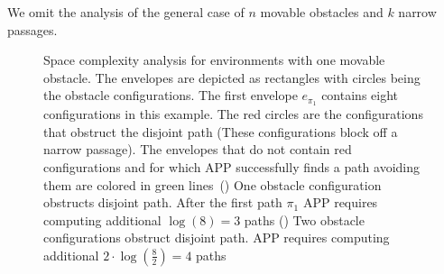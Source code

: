 \documentclass[a4paper]{report}
\begin{document}
We omit the analysis of the general case of $n$ movable obstacles and $k$ narrow passages.

\begin{figure}[H]
\begin{subfigure}{0.5\textwidth}
\centering
  \caption{}
  \label{fig:one_narrow}
\end{subfigure}
\hfill
\begin{subfigure}{0.5\textwidth}
\centering
  \caption{}
  \label{fig:two_narrow}
\end{subfigure}
    \caption{Space complexity analysis for environments with one movable obstacle. The envelopes are depicted as rectangles with circles being the obstacle configurations. The first envelope $e_{\pi_1}$ contains eight configurations in this example. The red circles are the configurations that obstruct the disjoint path (These configurations block off a narrow passage). The envelopes that do not contain red configurations and for which APP successfully finds a path avoiding them are colored in green lines~() One obstacle configuration obstructs disjoint path. After the first path $\pi_1$ APP requires computing additional $\log (8) = 3$ paths () Two obstacle configurations obstruct disjoint path. APP requires computing additional $2 \cdot \log (\frac{8}{2}) = 4$ paths}
    \label{fig:app_space}
\end{figure}
\end{document}
